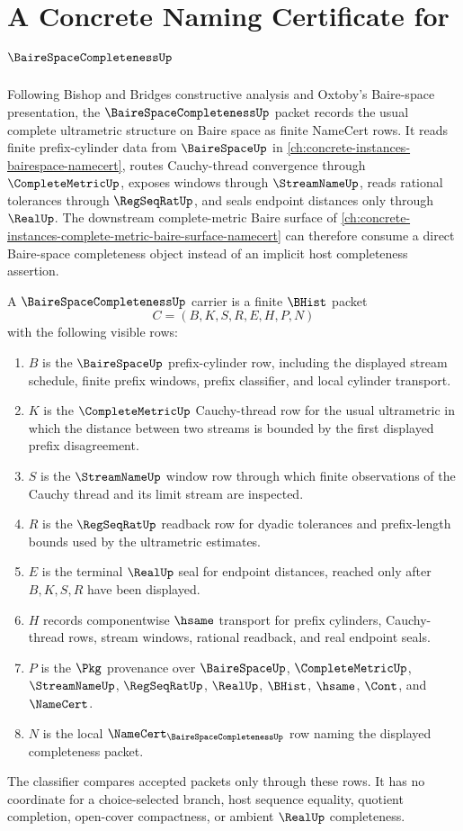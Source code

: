 \chapter{A Concrete Naming Certificate for $\BaireSpaceCompletenessUp$}
\label{ch:concrete-instances-baire-space-completeness-namecert}

Following Bishop and Bridges constructive analysis and Oxtoby's Baire-space presentation, the $\BaireSpaceCompletenessUp$ packet records the usual complete ultrametric structure on Baire space as finite NameCert rows. It reads finite prefix-cylinder data from $\BaireSpaceUp$ in \autoref{ch:concrete-instances-bairespace-namecert}, routes Cauchy-thread convergence through $\CompleteMetricUp$, exposes windows through $\StreamNameUp$, reads rational tolerances through $\RegSeqRatUp$, and seals endpoint distances only through $\RealUp$. The downstream complete-metric Baire surface of \autoref{ch:concrete-instances-complete-metric-baire-surface-namecert} can therefore consume a direct Baire-space completeness object instead of an implicit host completeness assertion.

\begin{definition}
\label{def:baire-space-completeness-carrier}
A $\BaireSpaceCompletenessUp$ carrier is a finite $\BHist$ packet
$$
C=(B,K,S,R,E,H,P,N)
$$
with the following visible rows:
\begin{enumerate}
\item $B$ is the $\BaireSpaceUp$ prefix-cylinder row, including the displayed stream schedule, finite prefix windows, prefix classifier, and local cylinder transport.
\item $K$ is the $\CompleteMetricUp$ Cauchy-thread row for the usual ultrametric in which the distance between two streams is bounded by the first displayed prefix disagreement.
\item $S$ is the $\StreamNameUp$ window row through which finite observations of the Cauchy thread and its limit stream are inspected.
\item $R$ is the $\RegSeqRatUp$ readback row for dyadic tolerances and prefix-length bounds used by the ultrametric estimates.
\item $E$ is the terminal $\RealUp$ seal for endpoint distances, reached only after $B,K,S,R$ have been displayed.
\item $H$ records componentwise $\hsame$ transport for prefix cylinders, Cauchy-thread rows, stream windows, rational readback, and real endpoint seals.
\item $P$ is the $\Pkg$ provenance over $\BaireSpaceUp$, $\CompleteMetricUp$, $\StreamNameUp$, $\RegSeqRatUp$, $\RealUp$, $\BHist$, $\hsame$, $\Cont$, and $\NameCert$.
\item $N$ is the local $\NameCert_{\BaireSpaceCompletenessUp}$ row naming the displayed completeness packet.
\end{enumerate}
The classifier compares accepted packets only through these rows. It has no coordinate for a choice-selected branch, host sequence equality, quotient completion, open-cover compactness, or ambient $\RealUp$ completeness.
\end{definition}

